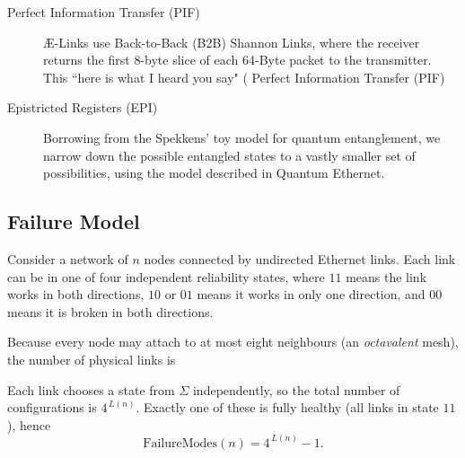 \documentclass[../OAE-SPEC-MAIN.tex]{subfiles}
\begin{document}
\begin{description}
\item [Perfect Information Transfer (PIF)] Æ-Links use Back-to-Back (B2B) Shannon Links, where the receiver returns the first 8-byte slice of each 64-Byte packet to the transmitter. This ``here is what I heard you say" ( Perfect Information Transfer (PIF)\cite{Paper from Garner}

\item [Epistricted Registers (EPI)] Borrowing from the Spekkens' toy model for quantum entanglement, we narrow down the possible entangled states to a vastly smaller set of possibilities, using the model described in Quantum Ethernet\cite{Quantum Ethernet}.
\end{description}



\subsection{Failure Model}

Consider a network of \(n\) nodes connected by undirected Ethernet
links.  Each link can be in one of four independent reliability
states,
\marginnote{
\[
\Sigma=\{00,01,10,11\},
\]}
where \(11\) means the link works in both directions, \(10\) or
\(01\) means it works in only one direction, and \(00\) means it
is broken in both directions.


Because every node may attach to at most eight neighbours (an
\emph{octavalent} mesh), the number of physical links is
\marginnote{
\[
L(n)=\min\!\bigl\{\tbinom{n}{2},\,4n\bigr\}
=
\begin{cases}
\binom{n}{2}, & n\le 9,\\[6pt]
4n,            & n\ge 9.
\end{cases}
\]}


Each link chooses a state from \(\Sigma\) independently, so the total
number of configurations is \(4^{\,L(n)}\).
Exactly one of these is fully healthy (all links in state \(11\)), hence
\[
\text{FailureModes}(n)=4^{\,L(n)}-1.
\]
\end{document}

